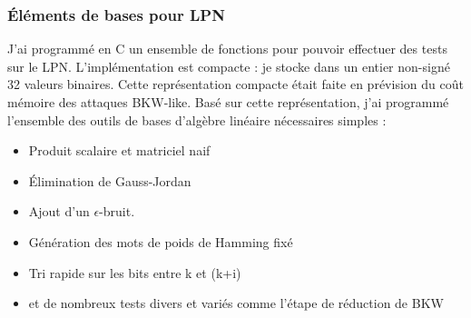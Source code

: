 \documentclass{article}		%
\theoremstyle{definition}
\theoremstyle{plain}
\theoremstyle{plain}
\theoremstyle{plain}
\theoremstyle{plain}
\begin{document}
\subsubsection{Éléments de bases pour LPN}
J'ai programmé en C un ensemble de fonctions pour pouvoir effectuer des
tests sur le LPN. L'implémentation est compacte : je stocke dans un
entier non-signé 32 valeurs binaires. Cette représentation compacte était
faite en prévision du coût mémoire des attaques BKW-like. Basé sur cette représentation, j'ai
programmé l'ensemble des outils de bases d'algèbre linéaire nécessaires
simples :
\\
\begin{itemize}
\item Produit scalaire et matriciel naif 
\item Élimination de Gauss-Jordan
\item Ajout d'un $\epsilon$-bruit.
\item Génération des mots de poids de Hamming fixé
\item Tri rapide sur les bits entre k et (k+i)
\item et de nombreux tests divers et variés comme l'étape de réduction de
BKW
\end{itemize}
\end{document}

